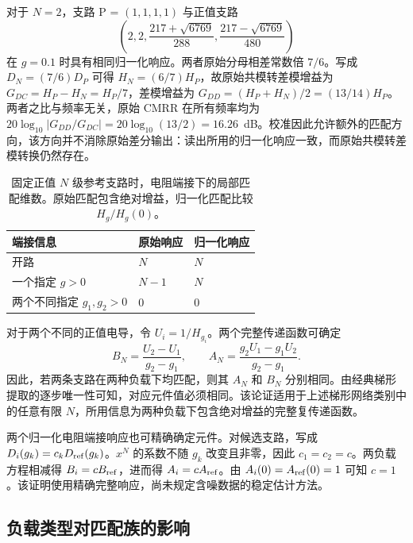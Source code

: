 对于 $N=2$，支路 P = $(1,1,1,1)$ 与正值支路
\[
\left(2,2,\frac{217+\sqrt{6769}}{288},\frac{217-\sqrt{6769}}{480}\right)
\]
在 $g=0.1$ 时具有相同归一化响应。两者原始分母相差常数倍 $7/6$。写成 $D_N=(7/6)D_P$ 可得 $H_N=(6/7)H_P$，故原始共模转差模增益为 $G_{DC}=H_P-H_N=H_P/7$，差模增益为 $G_{DD}=(H_P+H_N)/2=(13/14)H_P$。两者之比与频率无关，原始 CMRR 在所有频率均为 $20\log_{10}|G_{DD}/G_{DC}|=20\log_{10}(13/2)=16.26$~dB。校准因此允许额外的匹配方向，该方向并不消除原始差分输出：读出所用的归一化响应一致，而原始共模转差模转换仍然存在。

\begin{table}[htbp]
\centering
\caption{固定正值 $N$ 级参考支路时，电阻端接下的局部匹配维数。原始匹配包含绝对增益，归一化匹配比较 $H_g/H_g(0)$。}
\label{tab:matching-conventions}
\begin{tabular}{lll}
\toprule
端接信息 & 原始响应 & 归一化响应 \\
\midrule
开路 & $N$ & $N$ \\
一个指定 $g>0$ & $N-1$ & $N$ \\
两个不同指定 $g_1,g_2>0$ & $0$ & $0$ \\
\bottomrule
\end{tabular}
\end{table}

对于两个不同的正值电导，令 $U_i=1/H_{g_i}$。两个完整传递函数可确定
\begin{equation}\label{eq:general-two-load}
B_N=\frac{U_2-U_1}{g_2-g_1},\qquad
A_N=\frac{g_2U_1-g_1U_2}{g_2-g_1}.
\end{equation}
因此，若两条支路在两种负载下均匹配，则其 $A_N$ 和 $B_N$ 分别相同。由经典梯形提取的逐步唯一性可知，对应元件值必须相同\citep{guillemin1949rcsynthesis}。该论证适用于上述梯形网络类别中的任意有限 $N$，所用信息为两种负载下包含绝对增益的完整复传递函数。

两个归一化电阻端接响应也可精确确定元件。对候选支路，写成 $D_i(g_k)=c_kD_{\rm ref}(g_k)$。$x^N$ 的系数不随 $g_k$ 改变且非零，因此 $c_1=c_2=c$。两负载方程相减得 $B_i=cB_{\rm ref}$，进而得 $A_i=cA_{\rm ref}$。由 $A_i(0)=A_{\rm ref}(0)=1$ 可知 $c=1$。该证明使用精确完整响应，尚未规定含噪数据的稳定估计方法。

\subsection{负载类型对匹配族的影响}

